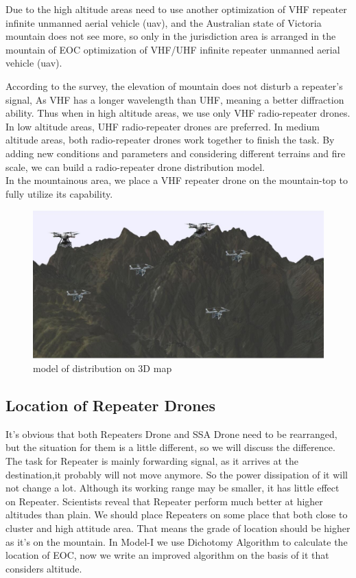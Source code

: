 \documentclass{mcmthesis}
\begin{document}
Due to the high altitude areas need to use another optimization of VHF repeater inﬁnite unmanned aerial vehicle (uav), and the Australian state of Victoria mountain does not see more, so only in the jurisdiction area is arranged in the mountain of EOC optimization of VHF/UHF inﬁnite repeater unmanned aerial vehicle (uav).

According to the survey, the elevation of mountain does not disturb a repeater’s signal, As VHF has a longer wavelength than UHF, meaning a better diﬀraction ability. Thus when in high altitude areas, we use only VHF radio-repeater drones. In low altitude areas, UHF radio-repeater drones are preferred. In medium altitude areas, both radio-repeater drones work together to ﬁnish the task. By adding new conditions and parameters and considering diﬀerent terrains and ﬁre scale, we can build a radio-repeater drone distribution model.
\\

In the mountainous area, we place a VHF repeater drone on the mountain-top to fully utilize its capability.


\begin{figure}[h]
	\small
	\centering
	\includegraphics[width=0.6\linewidth]{Figure/3D-Model.png}
	\caption{model of distribution on 3D map} \label{fig:3D-Model}
\end{figure}
\subsection{Location of Repeater Drones}
It’s obvious that both Repeaters Drone and SSA Drone need to be rearranged, but the situation for them is a little diﬀerent, so we will discuss the diﬀerence.
The task for Repeater is mainly forwarding signal, as it arrives at the destination,it probably will not  move anymore. So the power dissipation of it will not change a lot. Although its working range may be smaller, it has little eﬀect on Repeater.
Scientists reveal that Repeater perform much better at higher altitudes than plain. We should place Repeaters on some place that both close to cluster and high attitude area. That means the grade of location should be higher as it’s on the mountain. 
In Model-I we use Dichotomy Algorithm to calculate the location of EOC, now we write an improved algorithm on the basis of it that considers altitude.
\end{document}
